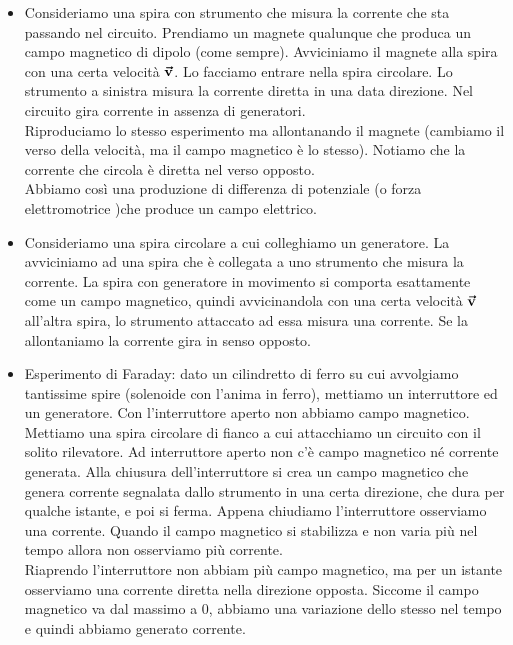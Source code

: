 \begin{itemize}
	\item Consideriamo una spira con strumento che misura la corrente che sta passando nel circuito. Prendiamo un magnete qualunque che produca un campo magnetico di dipolo (come sempre). Avviciniamo il magnete alla spira con una certa velocità $\vb*{\va{v}}$. Lo facciamo entrare nella spira circolare. Lo strumento a sinistra misura la corrente diretta in una data direzione. Nel circuito gira corrente in assenza di generatori.\\
	Riproduciamo lo stesso esperimento ma allontanando il magnete (cambiamo il verso della velocità, ma il campo magnetico è lo stesso). Notiamo che la corrente che circola è diretta nel verso opposto.\\
	Abbiamo così una produzione di differenza di potenziale (o forza elettromotrice )che produce un campo elettrico.
	\item Consideriamo una spira circolare a cui colleghiamo un generatore. La avviciniamo ad una spira che è collegata a uno strumento che misura la corrente. La spira con generatore in movimento si comporta esattamente come un campo magnetico, quindi avvicinandola con una certa velocità $\vb*{\va{v}}$ all'altra spira, lo strumento attaccato ad essa misura una corrente. Se la allontaniamo la corrente gira in senso opposto.
	\item Esperimento di Faraday: dato un cilindretto di ferro su cui avvolgiamo tantissime spire (solenoide con l'anima in ferro), mettiamo un interruttore ed un generatore. Con l'interruttore aperto non abbiamo campo magnetico. Mettiamo una spira circolare di fianco a cui attacchiamo un circuito con il solito rilevatore. Ad interruttore aperto non c'è campo magnetico né corrente generata. Alla chiusura dell'interruttore si crea un campo magnetico che genera corrente segnalata dallo strumento in una certa direzione, che dura per qualche istante, e poi si ferma. Appena chiudiamo l'interruttore osserviamo una corrente. Quando il campo magnetico si stabilizza e non varia più nel tempo allora non osserviamo più corrente.\\
	Riaprendo l'interruttore non abbiam più campo magnetico, ma per un istante osserviamo una corrente diretta nella direzione opposta. Siccome il campo magnetico va dal massimo a $0$, abbiamo una variazione dello stesso nel tempo e quindi abbiamo generato corrente.
\end{itemize}

